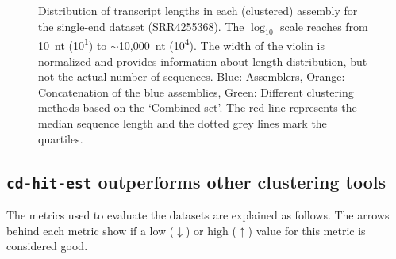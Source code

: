 \documentclass[12pt,a4paper,english]{article}
\begin{document}
	\begin{figure}[H]
		\centering
		\def\svgwidth{\textwidth}
		
		\caption[Distribution of transcript lengths per assembly (SE, SRR4255368)]{Distribution of transcript lengths in each (clustered) assembly for the single-end \ecoli dataset (SRR4255368). The $\log_{10}$ scale reaches from 10~nt (10\textsuperscript{1}) to $\sim$10,000~nt (10\textsuperscript{4}). The width of the violin is normalized and provides information about length distribution, but not the actual number of sequences. Blue: Assemblers, Orange: Concatenation of the blue assemblies, Green: Different clustering methods based on the `Combined set'. The red line represents the median sequence length and the dotted grey lines mark the quartiles.}
		\label{img:violin:eco_SRR4255368}
	\end{figure}


	
	\subsection{\texttt{cd-hit-est} outperforms other clustering tools}
		\label{ssec:comparison}
		The metrics used to evaluate the datasets are explained as follows. The arrows behind each metric show if a low ($\downarrow$) or high ($\uparrow$) value for this metric is considered good.
\end{document}
